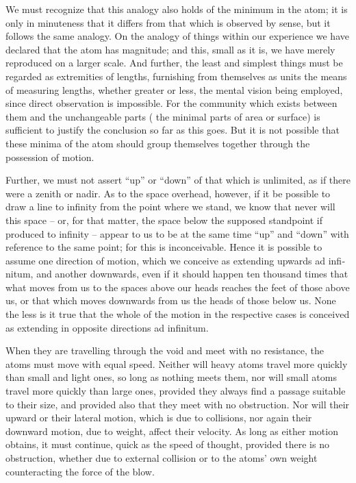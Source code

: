 \documentclass{stex}
\begin{document}
We must recognize that this analogy also holds of the minimum in the atom; it is only in minuteness that it differs from that which is observed by sense, but it follows the same analogy.
On the analogy of things within our experience we have declared that the atom has magnitude; and this, small as it is, we have merely reproduced on a larger scale.
And further, the least and simplest things must be regarded as extremities of lengths, furnishing from themselves as units the means of measuring lengths, whether greater or less, the mental vision being employed, since direct observation is impossible.
For the community which exists between them and the unchangeable parts (\idEst{} the minimal parts of area or surface) is sufficient to justify the conclusion so far as this goes.
But it is not possible that these minima of the atom should group themselves together through the possession of motion.

Further, we must not assert \enquote{up} or \enquote{down} of that which is unlimited, as if there were a zenith or nadir.
As to the space overhead, however, if it be possible to draw a line to infinity from the point where we stand, we know that never will this space – or, for that matter, the space below the supposed standpoint if produced to infinity – appear to us to be at the same time \enquote{up} and \enquote{down} with reference to the same point; for this is inconceivable.
Hence it is possible to assume one direction of motion, which we conceive as extending upwards \foreignlanguage{latin}{ad infinitum}, and another downwards, even if it should happen ten thousand times that what moves from us to the spaces above our heads reaches the feet of those above us, or that which moves downwards from us the heads of those below us.
None the less is it true that the whole of the motion in the respective cases is conceived as extending in opposite directions \foreignlanguage{latin}{ad infinitum}.

When they are travelling through the void and meet with no resistance, the atoms must move with equal speed.
Neither will heavy atoms travel more quickly than small and light ones, so long as nothing meets them, nor will small atoms travel more quickly than large ones, provided they always find a passage suitable to their size, and provided also that they meet with no obstruction.
Nor will their upward or their lateral motion, which is due to collisions, nor again their downward motion, due to weight, affect their velocity.
As long as either motion obtains, it must continue, quick as the speed of thought, provided there is no obstruction, whether due to external collision or to the atoms' own weight counteracting the force of the blow.
\end{document}
